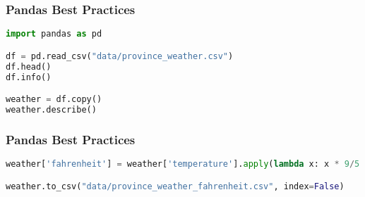 \documentclass[serif, 9pt, aspectratio=32]{beamer}
\begin{document}
\begin{frame}[fragile]
    \frametitle{Pandas Best Practices}
    \begin{lstlisting}[language=Python]
import pandas as pd

df = pd.read_csv("data/province_weather.csv")
df.head()
df.info()

weather = df.copy()
weather.describe()
    \end{lstlisting}
\end{frame}

\begin{frame}[fragile]
    \frametitle{Pandas Best Practices}
    \begin{lstlisting}[language=Python]
weather['fahrenheit'] = weather['temperature'].apply(lambda x: x * 9/5 + 32)

weather.to_csv("data/province_weather_fahrenheit.csv", index=False)
    \end{lstlisting}
\end{frame}
\end{document}

